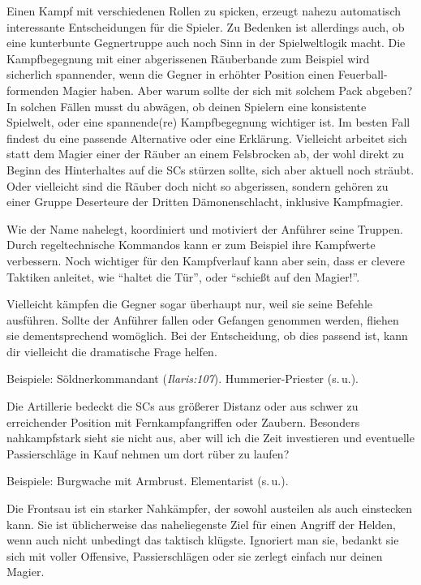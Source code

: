 Einen Kampf mit verschiedenen Rollen zu spicken, erzeugt nahezu automatisch interessante Entscheidungen für die Spieler.
Zu Bedenken ist allerdings auch, ob eine kunterbunte Gegnertruppe auch noch Sinn in der Spielweltlogik macht.
Die Kampfbegegnung mit einer abgerissenen Räuberbande zum Beispiel wird sicherlich spannender, wenn die Gegner in erhöhter Position einen Feuerball-formenden Magier haben.
Aber warum sollte der sich mit solchem Pack abgeben?
In solchen Fällen musst du abwägen, ob deinen Spielern eine konsistente Spielwelt, oder eine spannende(re) Kampfbegegnung wichtiger ist. 
Im besten Fall findest du eine passende Alternative oder eine Erklärung.
Vielleicht arbeitet sich statt dem Magier einer der Räuber an einem Felsbrocken ab, der wohl direkt zu Beginn des Hinterhaltes auf die SCs stürzen sollte, sich aber aktuell noch sträubt.
Oder vielleicht sind die Räuber doch nicht so abgerissen, sondern gehören zu einer Gruppe Deserteure der Dritten Dämonenschlacht, inklusive Kampfmagier.

Wie der Name nahelegt, koordiniert und motiviert der Anführer seine Truppen.
Durch regeltechnische Kommandos kann er zum Beispiel ihre Kampfwerte verbessern.
Noch wichtiger für den Kampfverlauf kann aber sein, dass er clevere Taktiken anleitet, wie \enquote{haltet die Tür}, oder \enquote{schießt auf den Magier!}.

Vielleicht kämpfen die Gegner sogar überhaupt nur, weil sie seine Befehle ausführen.
Sollte der Anführer fallen oder Gefangen genommen werden, fliehen sie dementsprechend womöglich.
Bei der Entscheidung, ob dies passend ist, kann dir vielleicht die dramatische Frage helfen.

Beispiele: Söldnerkommandant (\textit{Ilaris:107}). Hummerier-Priester (s.\,u.).

Die Artillerie bedeckt die SCs aus größerer Distanz oder aus schwer zu erreichender Position mit Fernkampfangriffen oder Zaubern.
Besonders nahkampfstark sieht sie nicht aus, aber will ich die Zeit investieren und eventuelle Passierschläge in Kauf nehmen um dort rüber zu laufen?

Beispiele: Burgwache mit Armbrust. Elementarist (s.\,u.).





Die Frontsau ist ein starker Nahkämpfer, der sowohl austeilen als auch einstecken kann.
Sie ist üblicherweise das naheliegenste Ziel für einen Angriff der Helden, wenn auch nicht unbedingt das taktisch klügste.
Ignoriert man sie, bedankt sie sich mit voller Offensive, Passierschlägen oder sie zerlegt einfach nur deinen Magier.

